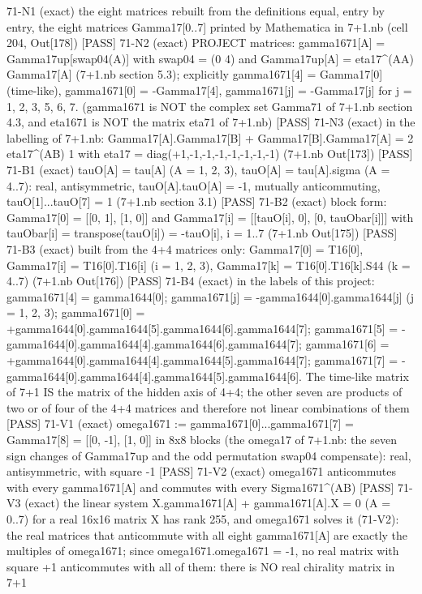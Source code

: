 \documentclass[
  10pt,
]{article}
\newenvironment{Shaded}{}{}
\newcommand{\NormalTok}[1]{#1}
\begin{document}
\begin{Shaded}
\begin{Highlighting}[]
\NormalTok{[PASS] 71{-}N1  (exact) the eight matrices rebuilt from the definitions equal, entry by entry, the eight matrices Gamma17[0..7] printed by Mathematica in 7+1.nb (cell 204, Out[178])}
\NormalTok{[PASS] 71{-}N2  (exact) PROJECT matrices: gamma1671[A] = Gamma17up[swap04(A)] with swap04 = (0 4) and Gamma17up[A] = eta17\^{}(AA) Gamma17[A] (7+1.nb section 5.3); explicitly gamma1671[4] = Gamma17[0] (time{-}like), gamma1671[0] = {-}Gamma17[4], gamma1671[j] = {-}Gamma17[j] for j = 1, 2, 3, 5, 6, 7.  (gamma1671 is NOT the complex set Gamma71 of 7+1.nb section 4.3, and eta1671 is NOT the matrix eta71 of 7+1.nb)}
\NormalTok{[PASS] 71{-}N3  (exact) in the labelling of 7+1.nb: Gamma17[A].Gamma17[B] + Gamma17[B].Gamma17[A] = 2 eta17\^{}(AB) 1 with eta17 = diag(+1,{-}1,{-}1,{-}1,{-}1,{-}1,{-}1,{-}1) (7+1.nb Out[173])}
\NormalTok{[PASS] 71{-}B1  (exact) tauO[A] = tau[A] (A = 1, 2, 3), tauO[A] = tau[A].sigma (A = 4..7): real, antisymmetric, tauO[A].tauO[A] = {-}1, mutually anticommuting, tauO[1]...tauO[7] = 1 (7+1.nb section 3.1)}
\NormalTok{[PASS] 71{-}B2  (exact) block form: Gamma17[0] = [[0, 1], [1, 0]] and Gamma17[i] = [[tauO[i], 0], [0, tauObar[i]]] with tauObar[i] = transpose(tauO[i]) = {-}tauO[i], i = 1..7 (7+1.nb Out[175])}
\NormalTok{[PASS] 71{-}B3  (exact) built from the 4+4 matrices only: Gamma17[0] = T16[0], Gamma17[i] = T16[0].T16[i] (i = 1, 2, 3), Gamma17[k] = T16[0].T16[k].S44 (k = 4..7) (7+1.nb Out[176])}
\NormalTok{[PASS] 71{-}B4  (exact) in the labels of this project: gamma1671[4] = gamma1644[0]; gamma1671[j] = {-}gamma1644[0].gamma1644[j] (j = 1, 2, 3); gamma1671[0] = +gamma1644[0].gamma1644[5].gamma1644[6].gamma1644[7]; gamma1671[5] = {-}gamma1644[0].gamma1644[4].gamma1644[6].gamma1644[7]; gamma1671[6] = +gamma1644[0].gamma1644[4].gamma1644[5].gamma1644[7]; gamma1671[7] = {-}gamma1644[0].gamma1644[4].gamma1644[5].gamma1644[6].  The time{-}like matrix of 7+1 IS the matrix of the hidden axis of 4+4; the other seven are products of two or of four of the 4+4 matrices and therefore not linear combinations of them}
\NormalTok{[PASS] 71{-}V1  (exact) omega1671 := gamma1671[0]...gamma1671[7] = Gamma17[8] = [[0, {-}1], [1, 0]] in 8x8 blocks (the omega17 of 7+1.nb: the seven sign changes of Gamma17up and the odd permutation swap04 compensate): real, antisymmetric, with square {-}1}
\NormalTok{[PASS] 71{-}V2  (exact) omega1671 anticommutes with every gamma1671[A] and commutes with every Sigma1671\^{}(AB)}
\NormalTok{[PASS] 71{-}V3  (exact) the linear system X.gamma1671[A] + gamma1671[A].X = 0 (A = 0..7) for a real 16x16 matrix X has rank 255, and omega1671 solves it (71{-}V2): the real matrices that anticommute with all eight gamma1671[A] are exactly the multiples of omega1671; since omega1671.omega1671 = {-}1, no real matrix with square +1 anticommutes with all of them: there is NO real chirality matrix in 7+1}

\end{Highlighting}
\end{Shaded}
\end{document}
